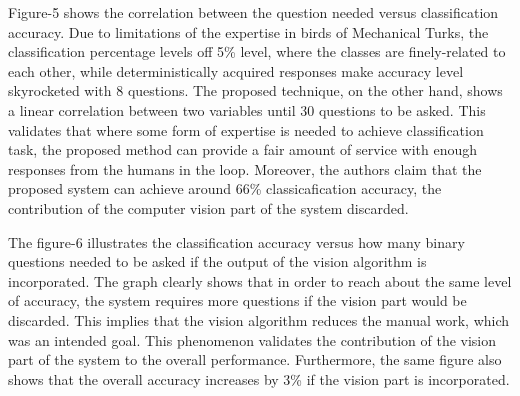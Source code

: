 \documentclass[11pt]{article}
\begin{document}
Figure-5 shows the correlation between the question needed versus classification accuracy.
Due to limitations of the expertise in birds of Mechanical Turks, the classification percentage levels off 5\% level, where the classes are finely-related to each other, while deterministically acquired responses make accuracy level skyrocketed with 8 questions.
The proposed technique, on the other hand, shows a linear correlation between two variables until 30 questions to be asked.
This validates that where some form of expertise is needed to achieve classification task, the proposed method can provide a fair amount of service with enough responses from the humans in the loop.
Moreover, the authors claim that the proposed system can achieve around 66\% classicafication accuracy, the contribution of the computer vision part of the system discarded.

The figure-6 illustrates the classification accuracy versus how many binary questions needed to be asked if the output of the vision algorithm is incorporated.
The graph clearly shows that in order to reach about the same level of accuracy, the system requires more questions if the vision part would be discarded.
This implies that the vision algorithm reduces the manual work, which was an intended goal.
This phenomenon validates the contribution of the vision part of the system to the overall performance.
Furthermore, the same figure also shows that the overall accuracy increases by 3\% if the vision part is incorporated.
% 
% 
\end{document}
